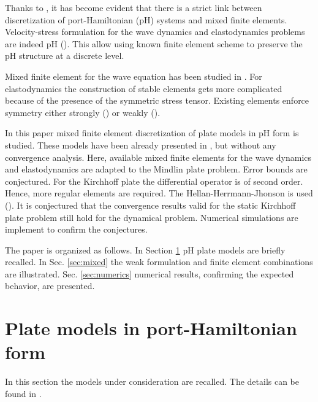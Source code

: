 \documentclass{ifacconf}
\begin{document}
Thanks to \cite{CardosoRibeiro2018}, it has become evident that there is a strict link between  discretization of port-Hamiltonian (pH) systems and mixed finite elements. Velocity-stress formulation for the wave dynamics and elastodynamics problems are indeed pH (\cite{Kirby2015}). This allow using known finite element scheme to preserve the pH structure at a discrete level.

Mixed finite element for the wave equation has been studied in \cite{Geveci,becacheWave}. For elastodynamics the construction of stable elements gets more complicated because of the presence of the symmetric stress tensor. Existing elements enforce symmetry either strongly (\cite{becacheElas}) or weakly (\cite{ArnoldWeak,mindlinVeiga}).

In this paper mixed finite element discretization of plate models in pH form is studied. These models have been already presented in \cite{BRUGNOLI2019940,BRUGNOLI2019961}, but without any convergence analysis. Here, available mixed finite elements for the wave dynamics and elastodynamics are adapted to the Mindlin plate problem. Error bounds are conjectured. For the Kirchhoff plate the differential operator is of second order. Hence, more regular elements are required. The Hellan-Herrmann-Jhonson is used (\cite{Blum1990,arnold2019hellan}). It is conjectured that the convergence results valid for the static Kirchhoff plate problem still hold for the  dynamical problem. Numerical simulations are implement to confirm the conjectures.

The paper is organized as follows. In Section \ref{sec:pHplates} pH plate models are briefly recalled. In Sec. \ref{sec:mixed} the weak formulation and finite element combinations are illustrated. Sec. \ref{sec:numerics} numerical results, confirming the expected behavior, are presented.

\section{Plate models in port-Hamiltonian form}
\label{sec:pHplates}

In this section the models under consideration are recalled. The details can be found in  \cite{BRUGNOLI2019961,BRUGNOLI2019940}. 
\end{document}
